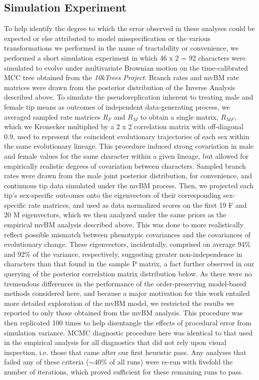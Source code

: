 \documentclass[10pt, twocolumn, twoside]{article}
\begin{document}
\subsection{Simulation Experiment}
To help identify the degree to which the error observed in these analyses could be expected or else attributed to model misspecification or the various transformations we performed in the name of tractability or convenience, we performed a short simulation experiment in which 46 x 2 = 92 characters were simulated to evolve under multivariate Brownian motion on the time-calibrated MCC tree obtained from the \emph{10kTrees Project}. Branch rates and mvBM rate matrices were drawn from the posterior distribution of the Inverse Analysis described above. To simulate the pseudoreplication inherent to treating male and female tip means as outcomes of independent data-generating process, we averaged sampled rate matrices $R_{F}$ and $R_{M}$ to obtain a single matrix, $R_{MF}$, which we Kronecker multiplied by a 2 x 2 correlation matrix with off-diagonal 0.9, used to represent the coincident evolutionary trajectories of each sex within the same evolutionary lineage. This procedure induced strong covariation in male and female values for the same character within a given lineage, but allowed for empirically realistic degrees of covariation between characters. Sampled branch rates were drawn from the male joint posterior distribution, for convenience, and continuous tip data simulated under the mvBM process. Then, we projected each tip's sex-specific outcomes onto the eigenvectors of their corresponding sex-specific rate matrices, and used as data normalized scores on the first 19 F and 20 M eigenvectors, which we then analyzed under the same priors as the empirical mvBM analysis described above. This was done to more realistically reflect possible mismatch between phenotypic covariances and the covariances of evolutionary change. These eigenvectors, incidentally, comprised on average 94\% and 92\% of the variance, respectively, suggesting greater non-independence in characters than that found in the sample P matrix, a fact further observed in our querying of the posterior correlation matrix distribution below. As there were no tremendous differences in the performance of the order-preserving model-based methods considered here, and because a major motivation for this work entailed more detailed exploration of the mvBM model, we restricted the results we reported to only those obtained from the mvBM analysis. This procedure was then replicated 100 times to help disentangle the effects of procedural error from simulation variance. MCMC diagnostic procedure here was identical to that used in the empirical analysis for all diagnostics that did not rely upon visual inspection, i.e. those that came after our first heuristic pass. Any analyses that failed any of these criteria ($\sim40$\% of all runs) were re-run with fivefold the number of iterations, which proved sufficient for these remaining runs to pass.
\end{document}
